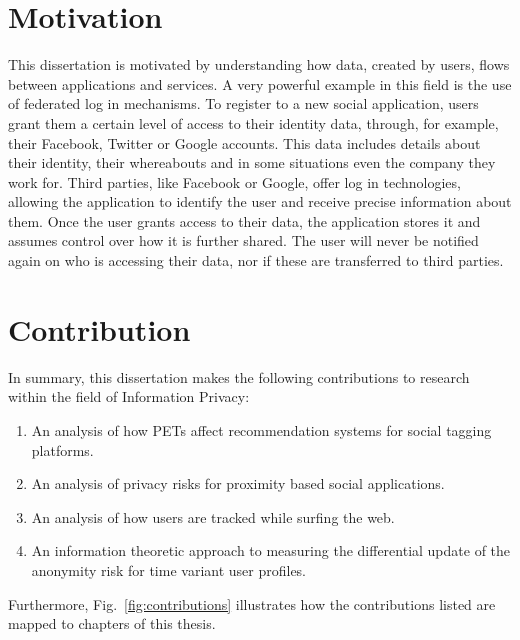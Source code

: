 \section{Motivation}

This dissertation is motivated by understanding how data, created by users, flows between applications and services. A very powerful example in this field is the use of federated log in mechanisms. To register to a new social application, users grant them a certain level of access to their identity data, through, for example, their Facebook, Twitter or Google accounts. This data includes details about their identity, their whereabouts and in some situations even the company they work for. Third parties, like Facebook or Google, offer log in technologies, allowing the application to identify the user and receive precise information about them. Once the user grants access to their data, the application stores it and assumes control over how it is further shared. The user will never be notified again on who is accessing their data, nor if these are transferred to third parties. 

\section{Contribution}

In summary, this dissertation makes the following contributions to research within the field of Information Privacy:

\begin{enumerate}
    \item An analysis of how PETs affect recommendation systems for social tagging platforms.
    \item An analysis of privacy risks for proximity based social applications.
    \item An analysis of how users are tracked while surfing the web.
    \item An information theoretic approach to measuring the differential update of the anonymity risk for time variant user profiles.
\end{enumerate}

Furthermore, Fig.~\ref{fig:contributions} illustrates how the contributions listed are mapped to chapters of this thesis.

